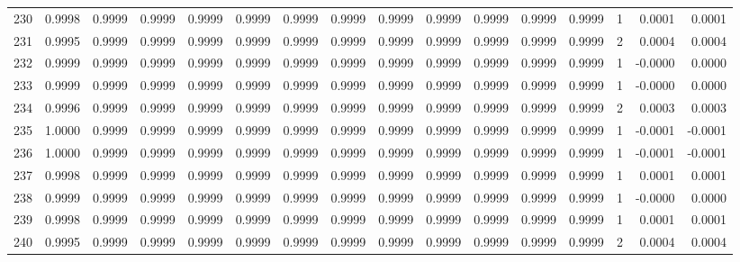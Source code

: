 \begin{tabular}{lrrrrrrrrrrrrrrr}
230 &      0.9998 &  0.9999 &  0.9999 &  0.9999 &  0.9999 &  0.9999 &  0.9999 &  0.9999 &  0.9999 &  0.9999 &   0.9999 &     0.9999 &      1 &                    0.0001 &                     0.0001 \\
231 &      0.9995 &  0.9999 &  0.9999 &  0.9999 &  0.9999 &  0.9999 &  0.9999 &  0.9999 &  0.9999 &  0.9999 &   0.9999 &     0.9999 &      2 &                    0.0004 &                     0.0004 \\
232 &      0.9999 &  0.9999 &  0.9999 &  0.9999 &  0.9999 &  0.9999 &  0.9999 &  0.9999 &  0.9999 &  0.9999 &   0.9999 &     0.9999 &      1 &                   -0.0000 &                     0.0000 \\
233 &      0.9999 &  0.9999 &  0.9999 &  0.9999 &  0.9999 &  0.9999 &  0.9999 &  0.9999 &  0.9999 &  0.9999 &   0.9999 &     0.9999 &      1 &                   -0.0000 &                     0.0000 \\
234 &      0.9996 &  0.9999 &  0.9999 &  0.9999 &  0.9999 &  0.9999 &  0.9999 &  0.9999 &  0.9999 &  0.9999 &   0.9999 &     0.9999 &      2 &                    0.0003 &                     0.0003 \\
235 &      1.0000 &  0.9999 &  0.9999 &  0.9999 &  0.9999 &  0.9999 &  0.9999 &  0.9999 &  0.9999 &  0.9999 &   0.9999 &     0.9999 &      1 &                   -0.0001 &                    -0.0001 \\
236 &      1.0000 &  0.9999 &  0.9999 &  0.9999 &  0.9999 &  0.9999 &  0.9999 &  0.9999 &  0.9999 &  0.9999 &   0.9999 &     0.9999 &      1 &                   -0.0001 &                    -0.0001 \\
237 &      0.9998 &  0.9999 &  0.9999 &  0.9999 &  0.9999 &  0.9999 &  0.9999 &  0.9999 &  0.9999 &  0.9999 &   0.9999 &     0.9999 &      1 &                    0.0001 &                     0.0001 \\
238 &      0.9999 &  0.9999 &  0.9999 &  0.9999 &  0.9999 &  0.9999 &  0.9999 &  0.9999 &  0.9999 &  0.9999 &   0.9999 &     0.9999 &      1 &                   -0.0000 &                     0.0000 \\
239 &      0.9998 &  0.9999 &  0.9999 &  0.9999 &  0.9999 &  0.9999 &  0.9999 &  0.9999 &  0.9999 &  0.9999 &   0.9999 &     0.9999 &      1 &                    0.0001 &                     0.0001 \\
240 &      0.9995 &  0.9999 &  0.9999 &  0.9999 &  0.9999 &  0.9999 &  0.9999 &  0.9999 &  0.9999 &  0.9999 &   0.9999 &     0.9999 &      2 &                    0.0004 &                     0.0004 \\

\end{tabular}
